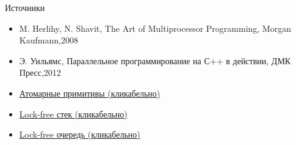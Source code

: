 \documentclass[14pt]{beamer}
\begin{document}
	\begin{frame}{Источники}
		\begin{itemize}
			\item M. Herlihy, N. Shavit, The Art of Multiprocessor Programming, Morgan Kaufmann,2008
			\item Э. Уильямс, Параллельное программирование на С++ в действии, ДМК Пресс,2012
			\item \href{https://habr.com/ru/post/195948/}{Атомарные примитивы (кликабельно)}
			\item \href{https://habr.com/ru/post/216013/}{Lock-free стек (кликабельно)}
			\item \href{https://habr.com/ru/post/219201/}{Lock-free очередь (кликабельно)}
		\end{itemize}
	\end{frame}
\end{document}
